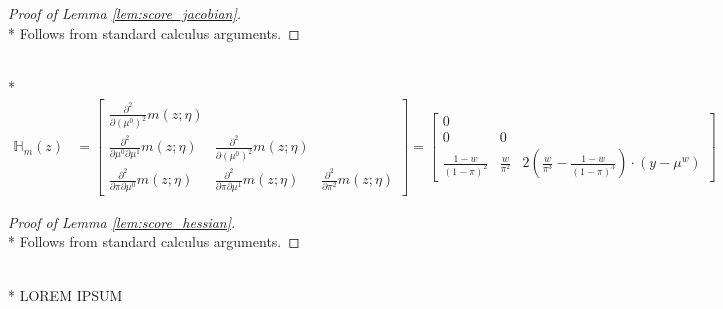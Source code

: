 \begin{proof}[Proof of Lemma \ref{lem:score_jacobian}]\mbox{}\\*
    Follows from standard calculus arguments.
\end{proof}

\begin{boxD}
    \begin{lem}\label{lem:score_hessian}\mbox{}\\*
    \begin{equation}
        \begin{aligned}
            \mathbb{H}_{m}(z)
            & = \begin{bmatrix}
                \frac{\partial^2}{\partial \left(\mu^{0}\right)^2} m\left(z; \eta\right)   & & \\
                \frac{\partial^2}{\partial \mu^{0} \partial \mu^{1}} m\left(z; \eta\right) & \frac{\partial^2}{\partial \left(\mu^{0}\right)^2} m\left(z; \eta\right) & \\
                \frac{\partial^2}{\partial \pi \partial \mu^{0}} m\left(z; \eta\right)     & \frac{\partial^2}{\partial \pi \partial \mu^{1}} m\left(z; \eta\right) & \frac{\partial^2}{\partial \pi^2} m\left(z; \eta\right)
            \end{bmatrix} 
            = \begin{bmatrix}
                0  & & \\
                0 & 0 & \\
                \frac{1-w}{\left(1-\pi\right)^{2}} & \frac{w}{\pi^2} & 2\left(\frac{w}{\pi^3} - \frac{1-w}{\left(1-\pi\right)^{3}}\right)  \cdot \left(y - \mu^{w}\right)
            \end{bmatrix}
        \end{aligned}
    \end{equation}
\end{lem}
\end{boxD}

\begin{proof}[Proof of Lemma \ref{lem:score_hessian}]\mbox{}\\*
    Follows from standard calculus arguments.
\end{proof}

\begin{boxD}
    \begin{lem}\label{lem:score_gateaux_derivative}\mbox{}\\*
        {\color{red} LOREM IPSUM}
    \end{lem}    
\end{boxD}

